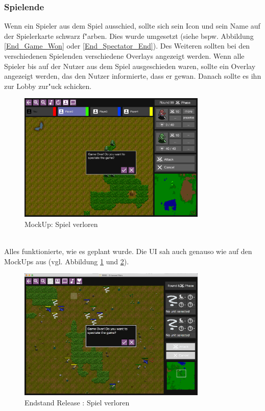 \documentclass[12pt, titlepage]{scrartcl}
\newcommand{\RN}[1]{%
	\textup{\uppercase\expandafter{\romannumeral#1}}%
}
\newcounter{subsubsubsection}[subsubsection]
\begin{document}
			\subsubsection{Spielende}
				Wenn ein Spieler aus dem Spiel ausschied, sollte sich sein Icon und sein Name auf der Spielerkarte schwarz f"arben. Dies wurde umgesetzt (siehe bspw. Abbildung \ref{End_Game_Won} oder \ref{End_Spectator_End}). Des Weiteren sollten bei den verschiedenen Spielenden verschiedene Overlays angezeigt werden.
					Wenn alle Spieler bis auf der Nutzer aus dem Spiel ausgeschieden waren, sollte ein Overlay angezeigt werden, das den Nutzer informierte, dass er gewan. Danach sollte es ihn zur Lobby zur"uck schicken.
					\begin{figure}[H] 
						\centering
						\includegraphics[width=0.8\textwidth]{images/mockUps/GameOver.png}
						\caption{MockUp: Spiel verloren}
						\label{Game_Lost_2}
					\end{figure}
					\ \\ Alles funktionierte, wie es geplant wurde. Die UI sah auch genauso wie auf den MockUps aus (vgl. Abbildung \ref{Game_Lost_2} und \ref{End_Game_Lost}).
					\begin{figure}[H] 
						\centering
						\includegraphics[width=0.8\textwidth]{images/endOfRelease/GameOver.png}
						\caption{Endstand Release \RN{3}: Spiel verloren}
						\label{End_Game_Lost}
					\end{figure}
\end{document}
